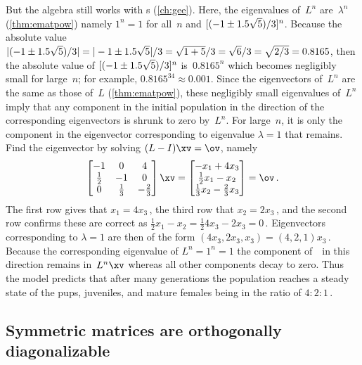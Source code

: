 \begin{example}
\begin{solution}
But the algebra still works with s (\autoref{ch:gee}).
Here, the eigenvalues of~\(L^n\) are~\(\lambda^n\) (\autoref{thm:ematpow}) namely \(1^n=1\) for all~\(n\) and \([(-1\pm 1.5\sqrt5)/3]^n\).
Because the absolute value \(|(-1\pm 1.5\sqrt5)/3|
=|-1\pm 1.5\sqrt5|/3=\sqrt{1+5}/3=\sqrt{6}/3=\sqrt{2/3}=0.8165\), then the absolute value of \([(-1\pm 1.5\sqrt5)/3]^n\) is~\(0.8165^n\) which becomes negligibly small for large~\(n\); for example, \(0.8165^{34}\approx 0.001\).
Since the eigenvectors of~\(L^n\) are the same as those of~\(L\) (\autoref{thm:ematpow}), these negligibly small eigenvalues of~\(L^n\) imply that any component in the initial population in the direction of the corresponding eigenvectors is shrunk to zero by~\(L^n\).
For large~\(n\), it is only the component in the eigenvector corresponding to eigenvalue \(\lambda=1\) that remains.
Find the eigenvector by solving \((L-I)\xv=\ov\), namely
\begin{equation*}
\begin{bmatrix} -1&0&4\\\frac12&-1&0\\0&\frac13&-\frac23 \end{bmatrix}\xv=\begin{bmatrix} -x_1+4x_3\\ \frac12x_1-x_2\\\frac13x_2-\frac23x_3 \end{bmatrix}=\ov\,.
\end{equation*}
The first row gives that \(x_1=4x_3\)\,, the third row that \(x_2=2x_3\)\,, and the second row confirms these are correct as \(\frac12x_1-x_2=\frac124x_3-2x_3=0\)\,.
Eigenvectors corresponding to \(\lambda=1\) are then of the form \((4x_3,2x_3,x_3)=(4,2,1)x_3\)\,.
Because the corresponding eigenvalue of \(L^n=1^n=1\) the component of~\xv\ in this direction remains in~\(L^n\xv\) whereas all other components decay to zero.
Thus the model predicts that after many generations the population reaches a steady state of the pups, juveniles, and mature females being in the ratio of \(4:2:1\)\,.
\end{solution}
\end{example}





\subsection{Symmetric matrices are orthogonally diagonalizable}
\label{sec:smod}

